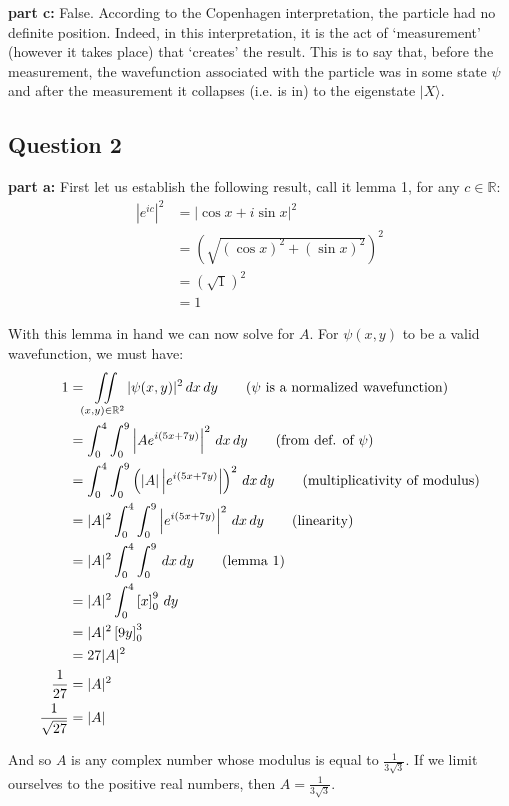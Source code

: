 \documentclass{article}
\renewcommand{\eval}[3]{\left[#1\right]_{#2}^{#3}}
\begin{document}
\noindent\textbf{part c:} False. According to the Copenhagen interpretation, the particle had no definite position. Indeed, in this interpretation, it is the act of `measurement' (however it takes place) that `creates' the result. This is to say that, before the measurement, the wavefunction associated with the particle was in some state $\psi$ and after the measurement it collapses (i.e. is in) to the eigenstate $|X\rangle$.
\bigskip

\subsection*{Question 2}
\noindent\textbf{part a:} First let us establish the following result, call it lemma 1, for any $c\in\mathbb R$:
\begin{align*}
    |e^{ic}|^2&=|\cos x+i\sin x|^2\tag{Euler's formula}\\
    &=\left(\sqrt{(\cos x)^2+(\sin x)^2}\right)^2\tag{def. of modulus}\\
    &=\left(\sqrt{1}\right)^2\tag{trig identity}\\
    &=1
\end{align*}

With this lemma in hand we can now solve for $A$. For $\psi(x,y)$ to be a valid wavefunction, we must have:
\begin{align*}
    1&=\iint\displaylimits_{(x,y)\in\mathbb R^2}|\psi(x,y)|^2\,dx\,dy\tag{$\psi$ is a normalized wavefunction}\\
    &=\int_0^4\int_0^9\left|Ae^{i(5x+7y)}\right|^2\,dx\,dy\tag{from def. of $\psi$}\\
    &=\int_0^4\int_0^9\left(|A|\left|e^{i(5x+7y)}\right|\right)^2\,dx\,dy\tag{multiplicativity of modulus}\\
    &=|A|^2\int_0^4\int_0^9\left|e^{i(5x+7y)}\right|^2\,dx\,dy\tag{linearity}\\
    &=|A|^2\int_0^4\int_0^9\,dx\,dy\tag{lemma 1}\\
    &=|A|^2\int_0^4\eval{x}{0}{9}\,dy\\
    &=|A|^2\eval{9y}{0}{3}\\
    &=27|A|^2\\
    \frac{1}{27}&=|A|^2\\
    \frac{1}{\sqrt{27}}&=|A|
\end{align*}

And so $A$ is any complex number whose modulus is equal to $\frac{1}{3\sqrt{3}}$. If we limit ourselves to the positive real numbers, then $A=\frac{1}{3\sqrt{3}}$.
\bigskip
\newpage
\end{document}
